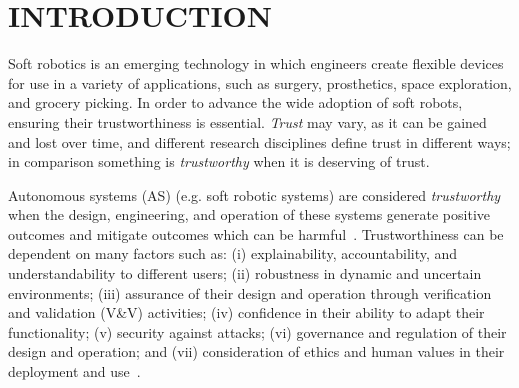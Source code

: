 \documentclass[letterpaper, 10 pt, conference]{ieeeconf}  %
\begin{document}
	\section{INTRODUCTION}\label{introduction}
	
	Soft robotics is an emerging technology in which engineers create flexible devices for use in a variety of applications, such as surgery, prosthetics, space exploration, and grocery picking. 
	In order to advance the wide adoption of soft robots, ensuring their trustworthiness is essential. 
	\emph{Trust} may vary, as it can be gained and lost over time, and different research disciplines define trust in different ways; in comparison something is \emph{trustworthy} when it is deserving of trust.

	Autonomous systems (AS) (e.g. soft robotic systems) are considered \emph{trustworthy} when the design, engineering, and operation of these systems generate positive outcomes and mitigate outcomes which can be harmful~\cite{Naiseh2022}.
	Trustworthiness can be dependent on many factors such as: (i) explainability, accountability, and understandability to different users; (ii) robustness in dynamic and uncertain environments; (iii) assurance of their design and operation through verification and validation (V\&V) activities; (iv) confidence in their ability to adapt their functionality; (v) security against attacks; (vi) governance and regulation of their design and operation; and (vii) consideration of ethics and human values in their deployment and use~\cite{Naiseh2022}. 
	
	
\end{document}
